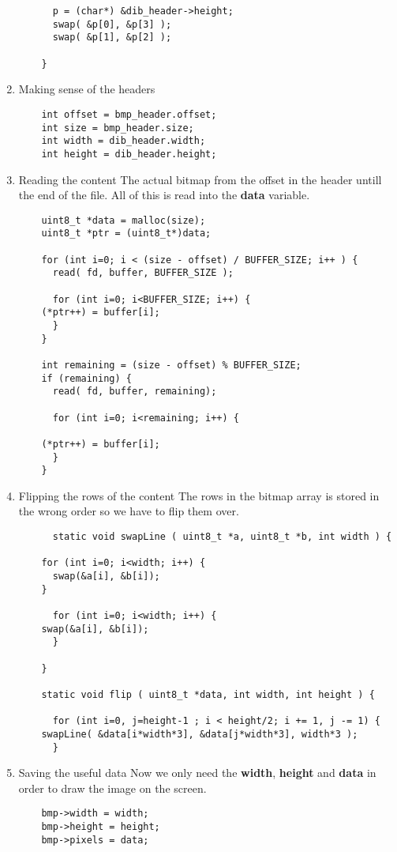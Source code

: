 \begin{enumerate}
\begin{lstlisting}
      p = (char*) &dib_header->height;
      swap( &p[0], &p[3] );
      swap( &p[1], &p[2] );

    }
  \end{lstlisting}

\item Making sense of the headers
  \begin{lstlisting}
    int offset = bmp_header.offset;
    int size = bmp_header.size;
    int width = dib_header.width;
    int height = dib_header.height;
  \end{lstlisting}
\item Reading the content \newline
  The actual bitmap from the offset in the header untill the end of the
  file. All of this is read into the {\bf data} variable.
  \begin{lstlisting}
    uint8_t *data = malloc(size);
    uint8_t *ptr = (uint8_t*)data;

    for (int i=0; i < (size - offset) / BUFFER_SIZE; i++ ) {
      read( fd, buffer, BUFFER_SIZE );

      for (int i=0; i<BUFFER_SIZE; i++) {
	(*ptr++) = buffer[i];
      }
    }

    int remaining = (size - offset) % BUFFER_SIZE;
    if (remaining) {
      read( fd, buffer, remaining);

      for (int i=0; i<remaining; i++) {

	(*ptr++) = buffer[i];
      }
    }
  \end{lstlisting}

  \item Flipping the rows of the content \newline
The rows in the bitmap array is stored in the wrong order so
we have to flip them over.
    \begin{lstlisting}
      static void swapLine ( uint8_t *a, uint8_t *b, int width ) {

	for (int i=0; i<width; i++) {
	  swap(&a[i], &b[i]);
	}

      for (int i=0; i<width; i++) {
	swap(&a[i], &b[i]);
      }

    }

    static void flip ( uint8_t *data, int width, int height ) {

      for (int i=0, j=height-1 ; i < height/2; i += 1, j -= 1) {
	swapLine( &data[i*width*3], &data[j*width*3], width*3 );
      }
    \end{lstlisting}
  \item Saving the useful data\newline
Now we only need the {\bf width}, {\bf height} and {\bf data} in order
to draw the image on the screen.
    \begin{lstlisting}
	bmp->width = width;
	bmp->height = height;
	bmp->pixels = data;
    \end{lstlisting}
\end{enumerate}

